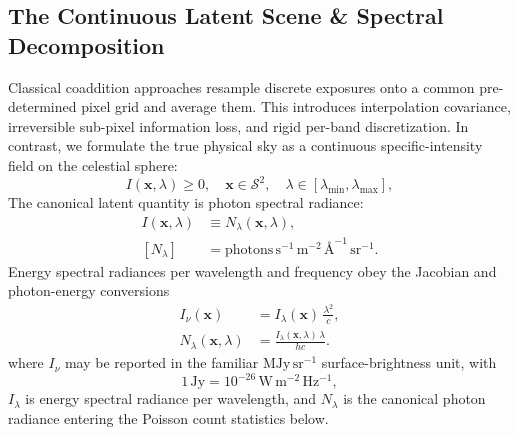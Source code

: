 \documentclass[11pt,a4paper]{article}
\begin{document}
\subsection{The Continuous Latent Scene \& Spectral Decomposition}
Classical coaddition approaches resample discrete exposures onto a common pre-determined pixel grid and average them. This introduces interpolation covariance, irreversible sub-pixel information loss, and rigid per-band discretization. In contrast, we formulate the true physical sky as a continuous specific-intensity field on the celestial sphere:
\begin{equation}
I(\boldsymbol{x}, \lambda) \ge 0, \quad \boldsymbol{x} \in \mathcal{S}^2, \quad \lambda \in [\lambda_{\min}, \lambda_{\max}],
\end{equation}
The canonical latent quantity is photon spectral radiance:
\begin{equation}
\begin{aligned}
I(\boldsymbol{x},\lambda) &\equiv N_\lambda(\boldsymbol{x},\lambda), \\
[N_\lambda] &=
\mathrm{photons}\,\mathrm{s}^{-1}\,\mathrm{m}^{-2}\,
\text{\AA}^{-1}\,\mathrm{sr}^{-1}.
\end{aligned}
\end{equation}
Energy spectral radiances per wavelength and frequency obey the Jacobian and
photon-energy conversions
\begin{equation}
\begin{aligned}
I_\nu(\boldsymbol{x})
    &= I_\lambda(\boldsymbol{x}) \, \frac{\lambda^{2}}{c}, \\
N_\lambda(\boldsymbol{x}, \lambda)
    &= \frac{I_\lambda(\boldsymbol{x}, \lambda)\,\lambda}{h c}.
\end{aligned}
\end{equation}
where $I_\nu$ may be reported in the familiar $\mathrm{MJy\,sr^{-1}}$
surface-brightness unit, with
\begin{equation}
1\,\mathrm{Jy}=10^{-26}\,\mathrm{W\,m^{-2}\,Hz^{-1}},
\end{equation}
$I_\lambda$ is energy spectral radiance per wavelength, and $N_\lambda$ is
the canonical photon radiance entering the Poisson count statistics below.
\end{document}
